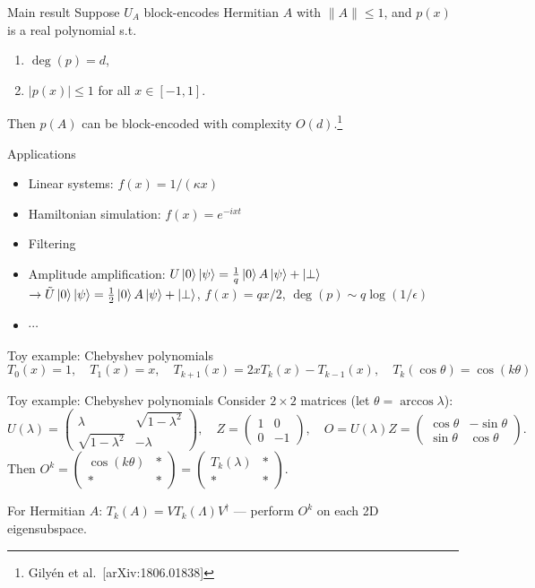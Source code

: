 \documentclass[aspectratio=169]{beamer}
\begin{document}
\begin{frame}{Main result}
Suppose $U_A$ block-encodes Hermitian $A$ with $\|A\|\le 1$, and $p(x)$ is a real polynomial s.t.\
\begin{enumerate}
\item $\deg(p)=d$,
\item $|p(x)|\le 1$ for all $x\in[-1,1]$.
\end{enumerate}
Then $p(A)$ can be block-encoded with complexity $O(d)$.\footnote{Gily\'{e}n et al.\ [arXiv:1806.01838]}
\end{frame}

\begin{frame}{Applications}
\begin{itemize}
\item Linear systems: $f(x)=1/(\kappa x)$
\item Hamiltonian simulation: $f(x)=e^{-ixt}$
\item Filtering
\item Amplitude amplification: $U\ket{0}\ket{\psi}=\frac{1}{q}\ket{0}A\ket{\psi}+\ket{\perp}$
$\to\tilde{U}\ket{0}\ket{\psi}=\frac{1}{2}\ket{0}A\ket{\psi}+\ket{\perp}$,\quad
$f(x)=qx/2$, $\deg(p)\sim q\log(1/\epsilon)$
\item $\cdots$
\end{itemize}
\end{frame}

\begin{frame}{Toy example: Chebyshev polynomials}
$$T_0(x)=1,\quad T_1(x)=x,\quad T_{k+1}(x)=2xT_k(x)-T_{k-1}(x),\quad T_k(\cos\theta)=\cos(k\theta)$$
\end{frame}

\begin{frame}{Toy example: Chebyshev polynomials}
Consider $2\times 2$ matrices (let $\theta=\arccos\lambda$):
$$U(\lambda)=\begin{pmatrix}\lambda&\sqrt{1-\lambda^2}\\\sqrt{1-\lambda^2}&-\lambda\end{pmatrix},\quad
Z=\begin{pmatrix}1&0\\0&-1\end{pmatrix},\quad
O=U(\lambda)Z=\begin{pmatrix}\cos\theta&-\sin\theta\\\sin\theta&\cos\theta\end{pmatrix}.$$
Then $O^k=\begin{pmatrix}\cos(k\theta)&*\\*&*\end{pmatrix}=\begin{pmatrix}T_k(\lambda)&*\\*&*\end{pmatrix}$.

For Hermitian $A$: $T_k(A)=VT_k(\Lambda)V^\dagger$ — perform $O^k$ on each 2D eigensubspace.
\end{frame}
\end{document}
